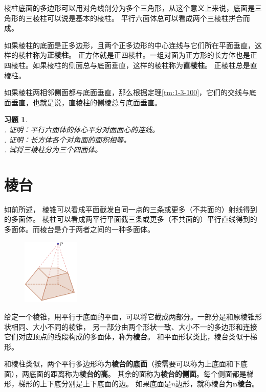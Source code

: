 \documentclass[12pt,UTF8]{ctexbook}
\newtheorem{xt}{习题}[section]
\begin{document}
棱柱底面的多边形可以用对角线剖分为多个三角形，从这个意义上来说，底面是三角形的三棱柱可以说是基本的棱柱。
平行六面体总可以看成两个三棱柱拼合而成。 

如果棱柱的底面是正多边形，且两个正多边形的中心连线与它们所在平面垂直，这样的棱柱称为\textbf{正棱柱}。
正方体就是正四棱柱。一组对面为正方形的长方体也是正四棱柱。如果棱柱的侧面总与底面垂直，这样的棱柱称为\textbf{直棱柱}。
正棱柱总是直棱柱。

如果棱柱两相邻侧面都与底面垂直，那么根据定理\ref{tm:1-3-100}，它们的交线与底面垂直，也就是说，直棱柱的侧棱总与底面垂直。
\begin{xt}
    \mbox{}\\
    . 证明：平行六面体的体心平分对面面心的连线。\\
    . 证明：长方体各个对角面的面积相等。\\
    . 试将三棱柱分为三个四面体。
\end{xt}

\section{棱台}
如前所述，
棱锥可以看成平面截发自同一点的三条或更多（不共面的）射线得到的多面体。
棱柱可以看成两平行平面截三条或更多（不共面的）平行直线得到的多面体。而棱台是介于两者之间的一种多面体。

\begin{figure} %
    \vspace{-20pt}
    \flushright
    \includegraphics[width=0.24\textwidth]{tu/棱台1.png}
\end{figure}

给定一个棱锥，用平行于底面的平面，可以将它截成两部分。一部分是和原棱锥形状相同、大小不同的棱锥，
另一部分由两个形状一致、大小不一的多边形和连接它们对应顶点的线段构成的多面体，称为\textbf{棱台}。
和平面形状类比，棱台类似于梯形。

和棱柱类似，两个平行多边形称为\textbf{棱台的底面}（按需要可以称为上底面和下底面），两底面的距离称为\textbf{棱台的高}。
其余的面称为\textbf{棱台的侧面}。每个侧面都是梯形，梯形的上下底分别是上下底面的边。
如果底面是$n$边形，就称棱台为$\mathbf{n}$\textbf{棱台}。
\end{document}

